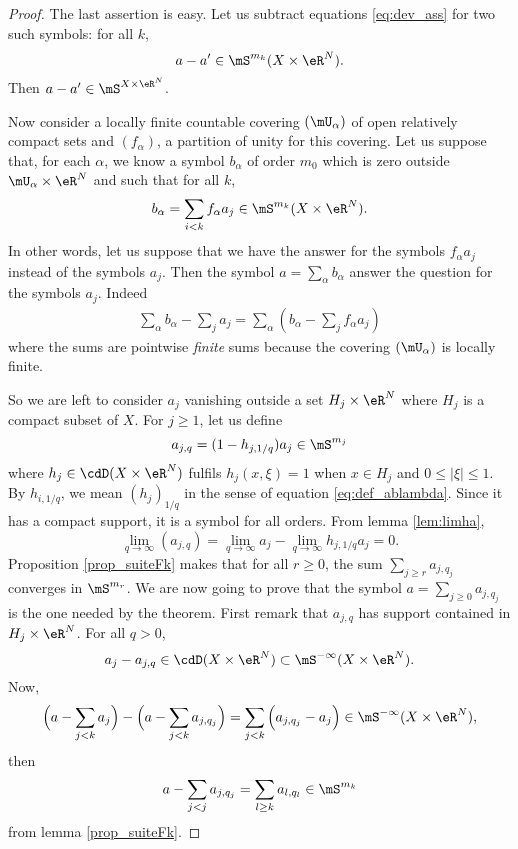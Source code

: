 \begin{proof}
The last assertion is easy. Let us subtract equations \eqref{eq:dev_ass} for two such symbols: for all $k$,
\[ 
a-a'\in\mS^{m_k}(X\times\eR^N).
\]
Then $a-a'\in\mS^{X\times\eR^N}$.

Now consider a locally finite countable covering $(\mU_{\alpha})$ of open relatively compact sets and $(f_{\alpha})$, a partition of unity for this covering. Let us suppose that, for each $\alpha$, we know a symbol $b_{\alpha}$ of order $m_0$ which is zero outside $\mU_{\alpha}\times\eR^N$ and such that for all $k$,
\[ 
  b_{\alpha}=\sum_{i<k}f_{\alpha}a_j\in\mS^{m_k}(X\times\eR^N).
\]
In other words, let us suppose that we have the answer for the symbols $f_{\alpha}a_j$ instead of the symbols $a_j$. Then the symbol $a=\sum_{\alpha}b_{\alpha}$ answer the question for the symbols $a_j$. Indeed
\begin{equation}
\begin{split}
\sum_{\alpha}b_{\alpha}-\sum_ja_j=\sum_{\alpha}(b_{\alpha}-\sum_jf_{\alpha}a_j)
\end{split}
\end{equation}
where the sums are pointwise \emph{finite} sums because the covering $(\mU_{\alpha})$ is locally finite.

So we are left to consider $a_j$ vanishing outside a set $H_j\times\eR^N$ where $H_j$ is a compact subset of $X$. For $j\geq 1$, let us define
\begin{equation}
a_{j,q}=(1-h_{j,1/q})a_j\in\mS^{m_j}
\end{equation}
where $h_j\in\cdD(X\times\eR^N)$ fulfils $h_j(x,\xi)=1$ when $x\in H_j$ and $0\leq|\xi|\leq 1$. By $h_{i,1/q}$, we mean $(h_j)_{1/q}$ in the sense of equation \eqref{eq:def_ablambda}. Since it has a compact support, it is a symbol for all orders. From lemma \ref{lem:limha},
\[ 
  \lim_{q\to\infty}(a_{j,q})=\lim_{q\to\infty}a_j-\lim_{q\to\infty}h_{j,1/q}a_j=0.
\]
Proposition \ref{prop_suiteFk} makes that for all $r\geq 0$, the sum $\sum_{j\geq r}a_{j,q_j}$ converges in $\mS^{m_r}$. We are now going to prove that the symbol $a=\sum_{j\geq 0}a_{j,q_j}$ is the one needed by the theorem. First remark that $a_{j,q}$ has support contained in $H_j\times\eR^N$. For all $q>0$,
\[ 
a_j-a_{j,q}\in\cdD(X\times\eR^N)\subset\mS^{-\infty}(X\times\eR^N).
\]
Now,
\[ 
  \Big( a-\sum_{j<k}a_j \Big)-\Big( a-\sum_{j<k}a_{j,q_j} \Big)=\sum_{j<k}\Big( a_{j,q_j}-a_j \Big)\in\mS^{-\infty}(X\times\eR^N),
\]
then
\[ 
a-\sum_{j<j}a_{j,q_j}=\sum_{l\geq k}a_{l,q_l}\in\mS^{m_k}
\]
from lemma \ref{prop_suiteFk}.

\end{proof}

